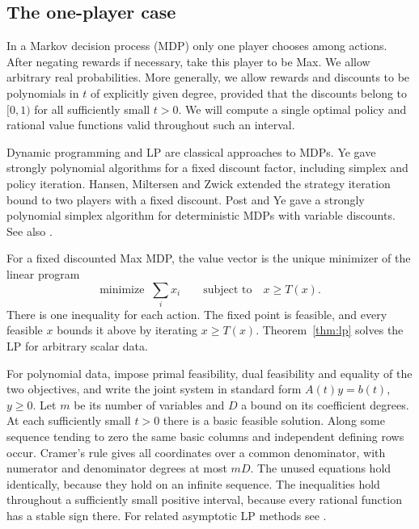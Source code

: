 \subsection{The one-player case}\label{sec:mdp}

In a Markov decision process (MDP) only one player chooses among
actions. After negating rewards if necessary, take this player to be
Max. We allow arbitrary real probabilities. More generally, we allow
rewards and discounts to be polynomials in \(t\) of explicitly given
degree, provided that the discounts belong to \([0,1)\) for all
sufficiently small \(t>0\). We will compute a single optimal policy
and rational value functions valid throughout such an interval.

Dynamic programming \cite{BELL,PUT,HOW} and LP \cite{Dpen} are
classical approaches to MDPs. Ye \cite{Ye,YeSim} gave strongly
polynomial algorithms for a fixed discount factor, including simplex
and policy iteration. Hansen, Miltersen and Zwick \cite{HMZ} extended
the strategy iteration bound to two players with a fixed discount.
Post and Ye \cite{PY} gave a strongly polynomial simplex algorithm
for deterministic MDPs with variable discounts. See also \cite{Uz}.

For a fixed discounted Max MDP, the value vector is the unique minimizer
of the linear program
\[
      \text{minimize }\ \sum_i x_i
      \qquad\text{subject to}\quad x\ge T(x).
\]
There is one inequality for each action. The fixed point is feasible,
and every feasible \(x\) bounds it above by iterating \(x\ge T(x)\).
Theorem~\ref{thm:lp} solves the LP for arbitrary scalar data.

For polynomial data, impose primal feasibility, dual feasibility and
equality of the two objectives, and write the joint system in standard
form \(A(t)y=b(t)\), \(y\ge0\). Let \(m\) be its number of variables
and \(D\) a bound on its coefficient degrees. At each sufficiently
small \(t>0\) there is a basic feasible solution. Along some sequence
tending to zero the same basic columns and independent defining rows
occur. Cramer's rule gives all coordinates over a common denominator,
with numerator and denominator degrees at most \(mD\). The unused
equations hold identically, because they hold on an infinite sequence.
The inequalities hold throughout a sufficiently small positive
interval, because every rational function has a stable sign there.
For related asymptotic LP methods see \cite{Jero,FAA,Vein}.

